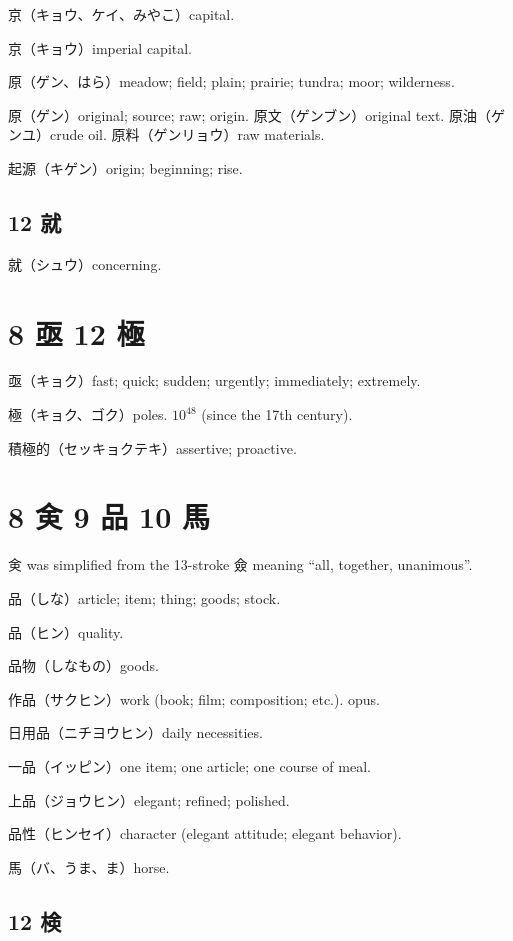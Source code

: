 京（キョウ、ケイ、みやこ）capital.

京（キョウ）imperial capital.

原（ゲン、はら）meadow; field; plain; prairie; tundra; moor; wilderness.

原（ゲン）original; source; raw; origin.
原文（ゲンブン）original text.
原油（ゲンユ）crude oil.
原料（ゲンリョウ）raw materials.

起源（キゲン）origin; beginning; rise.

\subsection{12 就}

就（シュウ）concerning.

\section{8 亟 12 極}

亟（キョク）fast; quick; sudden; urgently; immediately; extremely.

極（キョク、ゴク）poles.
\(10^{48}\) (since the 17th century).

積極的（セッキョクテキ）assertive; proactive.

\section{8 㑒 9 品 10 馬}

㑒 was simplified from the 13-stroke 僉
meaning ``all, together, unanimous''.

品（しな）article; item; thing; goods; stock.

品（ヒン）quality.

品物（しなもの）goods.

作品（サクヒン）work (book; film; composition; etc.). opus.

日用品（ニチヨウヒン）daily necessities.

一品（イッピン）one item; one article; one course of meal.

上品（ジョウヒン）elegant; refined; polished.

品性（ヒンセイ）character (elegant attitude; elegant behavior).

馬（バ、うま、ま）horse.

\subsection{12 検}

